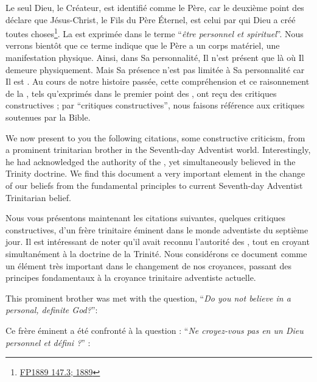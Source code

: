 Le seul Dieu, le Créateur, est identifié comme le Père, car le deuxième point des  déclare que Jésus-Christ, le Fils du Père Éternel, est celui par qui Dieu a créé toutes choses\footnote{\href{https://egwwritings.org/?ref=en_FP1889.147.3&para=931.7}{FP1889 147.3; 1889}}. La  est exprimée dans le terme “\textit{être personnel et spirituel}”. Nous verrons bientôt que ce terme indique que le Père a un corps matériel, une manifestation physique. Ainsi, dans Sa personnalité, Il n'est présent que là où Il demeure physiquement. Mais Sa présence n'est pas limitée à Sa personnalité car Il est . Au cours de notre histoire passée, cette compréhension et ce raisonnement de la , tels qu'exprimés dans le premier point des , ont reçu des critiques constructives ; par “critiques constructives”, nous faisons référence aux critiques soutenues par la Bible.


We now present to you the following citations, some constructive criticism, from a prominent trinitarian brother in the Seventh-day Adventist world. Interestingly, he had acknowledged the authority of the , yet simultaneously believed in the Trinity doctrine. We find this document a very important element in the change of our beliefs from the fundamental principles to current Seventh-day Adventist Trinitarian belief.


Nous vous présentons maintenant les citations suivantes, quelques critiques constructives, d'un frère trinitaire éminent dans le monde adventiste du septième jour. Il est intéressant de noter qu'il avait reconnu l'autorité des , tout en croyant simultanément à la doctrine de la Trinité. Nous considérons ce document comme un élément très important dans le changement de nos croyances, passant des principes fondamentaux à la croyance trinitaire adventiste actuelle.


This prominent brother was met with the question, “\textit{Do you not believe in a personal, definite God?}”:


Ce frère éminent a été confronté à la question : “\textit{Ne croyez-vous pas en un Dieu personnel et défini ?}” :




